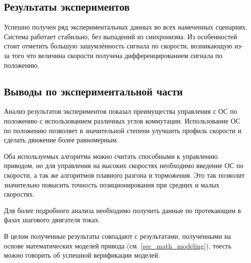 \subsection{Результаты экспериментов}

Успешно получен ряд экспериментальных данных во всех намеченных сценариях.
Система работает стабильно, без выпадений из синхронизма.
Из особенностей стоит отметить большую зашумлённость сигнала по скорости,
возникающую из-за того что величина скорости получена дифференцированием сигнала
по положению.

\subsection{Выводы по экспериментальной части}

Анализ результатов экспериментов показал преимущества управления с ОС
по положению с использованием различных углов коммутации. Использование ОС
по положению позволяет в значительной степени улучшить профиль скорости
и сделать движение более равномерным.

Оба используемых алгоритма можно считать способными к управлению приводом, но
для управления на высоких скоростях необходимо введение ОС по скорости, а так же
алгоритмов плавного разгона и торможения. Это так позволит значительно повысить
точность позиционирования при средних и малых скоростях.

Для более подробного анализа необходимо получить данные по протекающим в фазах
шагового двигателя токах.

В целом полученные результаты совпадают с результатами, полученными на основе
математических моделей привода (см. \ref{sec_math_modeling}), тоесть можно говорить
об успешной верификации моделей.
